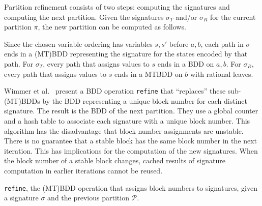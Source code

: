 
Partition refinement consists of two steps: computing the signatures and computing the next partition.
Given the signatures $\sigma_T$ and/or $\sigma_R$ for the current partition $\pi$,
the new partition can be computed as follows.



Since the chosen variable ordering has variables $s,s'$ before $a,b$,
each path in $\sigma$
ends in a (MT)BDD representing the signature for the states encoded by that path.
%
%
For $\sigma_T$, every path that assigns values to $s$ ends in a BDD on $a,b$.
%
%
For $\sigma_R$, every path that assigns values to $s$ ends in a MTBDD on $b$ with rational leaves.
%




Wimmer et al.~\cite{DBLP:conf/atva/WimmerHHSB06} present a BDD operation \texttt{refine} that ``replaces''  these sub-(MT)BDDs by the BDD representing a unique block number for each distinct signature.
The result is the BDD of the next partition.
%
%
%
They use a global counter and a hash table to associate each signature with a unique block number.
%
%
This algorithm has the disadvantage that block number assignments are unstable.
%
%
There is no guarantee that a stable block has the same block number in the next iteration.
%
%
This has implications for the computation of the new signatures.
%
%
When the block number of a stable block changes, cached results of signature computation in earlier iterations cannot be reused.


\begin{algorithm}[t!]
\caption{\texttt{refine}, the (MT)BDD operation that assigns block numbers to signatures, given a signature $\sigma$ and the previous partition $\mathcal{P}$.}
\label{alg:refine}
\end{algorithm}



